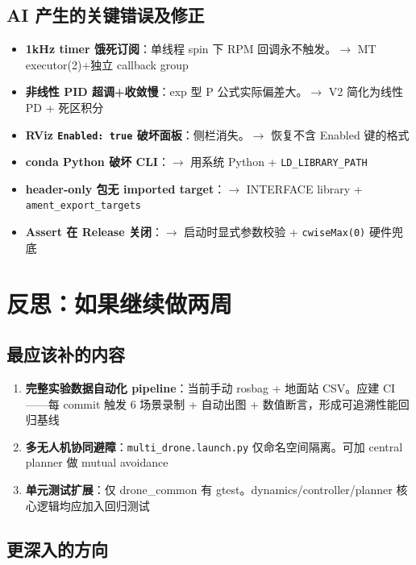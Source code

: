 \documentclass[12pt,a4paper]{article}
\begin{document}
\subsection{AI 产生的关键错误及修正}
\begin{itemize}[nosep]
  \item \textbf{1kHz timer 饿死订阅}：单线程 spin 下 RPM 回调永不触发。$\to$ MT executor(2)+独立 callback group
  \item \textbf{非线性 PID 超调+收敛慢}：exp 型 P 公式实际偏差大。$\to$ V2 简化为线性 PD + 死区积分
  \item \textbf{RViz \texttt{Enabled: true} 破坏面板}：侧栏消失。$\to$ 恢复不含 Enabled 键的格式
  \item \textbf{conda Python 破坏 CLI}：$\to$ 用系统 Python + \texttt{LD\_LIBRARY\_PATH}
  \item \textbf{header-only 包无 imported target}：$\to$ INTERFACE library + \texttt{ament\_export\_targets}
  \item \textbf{Assert 在 Release 关闭}：$\to$ 启动时显式参数校验 + \texttt{cwiseMax(0)} 硬件兜底
\end{itemize}


\section{反思：如果继续做两周}

\subsection{最应该补的内容}

\begin{enumerate}[leftmargin=*]
  \item \textbf{完整实验数据自动化 pipeline}：当前手动 rosbag + 地面站 CSV。应建 CI——每 commit 触发 6 场景录制 + 自动出图 + 数值断言，形成可追溯性能回归基线
  \item \textbf{多无人机协同避障}：\texttt{multi\_drone.launch.py} 仅命名空间隔离。可加 central planner 做 mutual avoidance
  \item \textbf{单元测试扩展}：仅 drone\_common 有 gtest。dynamics/controller/planner 核心逻辑均应加入回归测试
\end{enumerate}

\subsection{更深入的方向}
\end{document}
